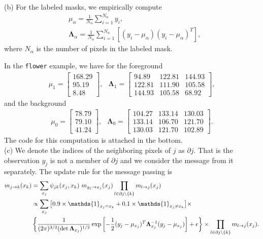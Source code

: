 \documentclass{article}
\begin{document}
\noindent
(b) For the labeled masks, we empirically compute
\begin{align*}
	&\mu_\alpha = \frac{1}{N_\alpha}\sum_{i=1}^{N_\alpha}y_i,\\
	&\mathbf{\Lambda}_{\alpha} = \frac{1}{N_\alpha}\sum_{i=1}^{N_\alpha}\left[(y_i - \mu_\alpha)(y_i - \mu_\alpha)^T\right],
\end{align*}
where $N_\alpha$ is the number of pixels in the labeled mask.
%

In the \texttt{flower} example, we have for the foreground
\begin{align*}
	\mu_1 = 
	\begin{bmatrix}
    168.29 \\
    95.19 \\
    8.48
\end{bmatrix}, \;\;\,
	\mathbf{\Lambda}_1 =
\begin{bmatrix}
 94.89 & 122.81 & 144.93 \\
 122.81 & 111.90 & 105.58 \\
 144.93 & 105.58 &  68.92
\end{bmatrix},
\end{align*}
and the background
\begin{align*}
	\mu_0 = 
	\begin{bmatrix}
    78.79 \\
    79.10 \\
    41.24
\end{bmatrix}, \;\;\,
	\mathbf{\Lambda}_0 =
\begin{bmatrix}
104.27 & 133.14 & 130.03 \\
133.14 & 106.70 & 121.70 \\
130.03 & 121.70 & 102.89
\end{bmatrix}.
\end{align*}
The code for this computation is attached in the bottom.
\\

\noindent
(c)
We denote the indices of the neighboring pixels of $j$ as $\partial j$. That is the observation $y_j$ is not a member of $\partial j$ and we consider the message from it separately. The update rule for the message passing is
\begin{align*}
	m_{j\to k}(x_k) &= \sum_{x_j} \psi_{jk}(x_j, x_k)\,\,m_{y_j\to x_j}(x_j) \prod_{l\in\partial{j}\backslash\{k\}}m_{l\to j}(x_j)\\
	&\propto \sum_{x_j} \big[0.9\times\mathds{1}_{x_j = x_k} + 0.1\times\mathds{1}_{x_j \neq x_k} \big] \times\\
	& \left\{\frac{1}{(2\pi)^{3/2}(\det {\bf\Lambda}_{x_j})^{1/2}} \exp\left[-\frac{1}{2}(y_j-\mu_{x_j})^T\mathbf{\Lambda}^{-1}_{x_j}(y_j - \mu_{x_j})\right] + \epsilon\right\}
	\times \prod_{l\in\partial{j}\backslash\{k\}}m_{l\to j}(x_j).
\end{align*}
%
\end{document}
